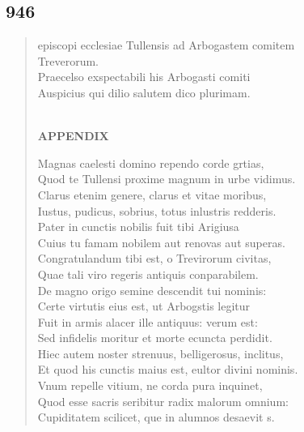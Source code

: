 \documentclass[11pt, a4paper]{report}
\begin{document}
            \subsection*{946}
      \begin{verse}
      episcopi ecclesiae Tullensis ad Arbogastem comitem \\ Treverorum. \\ Praecelso exspectabili his Arbogasti comiti \\ Auspicius qui dilio salutem dico plurimam. \\ 
        ﻿\pagebreak 
    \begin{center} \textbf{APPENDIX} \end{center} \marginpar{[368]} Magnas caelesti domino rependo corde grtias, \\ Quod te Tullensi proxime magnum in urbe vidimus. \\ Clarus etenim genere, clarus et vitae moribus, \\ Iustus, pudicus, sobrius, totus inlustris redderis. \\ Pater in cunctis nobilis fuit tibi Arigiusa \\ Cuius tu famam nobilem aut renovas aut superas. \\ Congratulandum tibi est, o Trevirorum civitas, \\ Quae tali viro regeris antiquis conparabilem. \\ De magno origo semine descendit tui nominis: \\ Certe virtutis eius est, ut Arbogstis legitur \\ Fuit in armis alacer ille antiquus: verum est: \\ Sed infidelis moritur et morte ecuncta perdidit. \\ Hiec autem noster strenuus, belligerosus, inclitus, \\ Et quod his cunctis maius est, eultor divini nominis. \\ Vnum repelle vitium, ne corda pura inquinet, \\ Quod esse sacris seribitur radix malorum omnium: \\ Cupiditatem scilicet, que in alumnos desaevit s. \\ 
      \end{verse}
  
\end{document}
